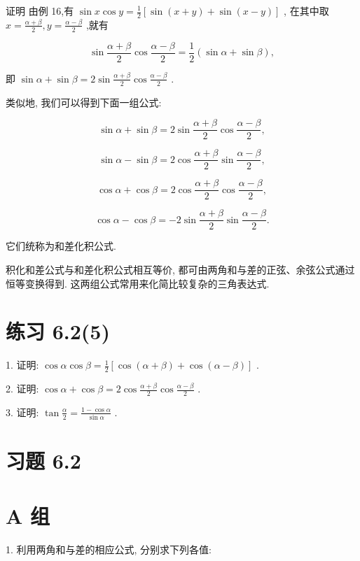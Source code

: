 \documentclass[10pt]{article}
\begin{document}
证明 由例 16,有 \(\sin x\cos y = \frac{1}{2}\left\lbrack  {\sin \left( {x + y}\right)  + \sin \left( {x - y}\right) }\right\rbrack\) , 在其中取 \(x = \frac{\alpha  + \beta }{2},y = \frac{\alpha  - \beta }{2}\) ,就有

\[
\sin \frac{\alpha  + \beta }{2}\cos \frac{\alpha  - \beta }{2} = \frac{1}{2}\left( {\sin \alpha  + \sin \beta }\right) ,
\]

即 \(\sin \alpha  + \sin \beta  = 2\sin \frac{\alpha  + \beta }{2}\cos \frac{\alpha  - \beta }{2}\) .

类似地, 我们可以得到下面一组公式:

\[
\sin \alpha  + \sin \beta  = 2\sin \frac{\alpha  + \beta }{2}\cos \frac{\alpha  - \beta }{2},
\]

\[
\sin \alpha  - \sin \beta  = 2\cos \frac{\alpha  + \beta }{2}\sin \frac{\alpha  - \beta }{2},
\]

\[
\cos \alpha  + \cos \beta  = 2\cos \frac{\alpha  + \beta }{2}\cos \frac{\alpha  - \beta }{2},
\]

\[
\cos \alpha  - \cos \beta  =  - 2\sin \frac{\alpha  + \beta }{2}\sin \frac{\alpha  - \beta }{2}.
\]

它们统称为和差化积公式.

积化和差公式与和差化积公式相互等价, 都可由两角和与差的正弦、余弦公式通过恒等变换得到. 这两组公式常用来化简比较复杂的三角表达式.

\section*{练习 6.2(5)}

1. 证明: \(\cos \alpha \cos \beta  = \frac{1}{2}\left\lbrack  {\cos \left( {\alpha  + \beta }\right)  + \cos \left( {\alpha  - \beta }\right) }\right\rbrack\) .

2. 证明: \(\cos \alpha  + \cos \beta  = 2\cos \frac{\alpha  + \beta }{2}\cos \frac{\alpha  - \beta }{2}\) .

3. 证明: \(\tan \frac{\alpha }{2} = \frac{1 - \cos \alpha }{\sin \alpha }\) .

\section*{习题 6.2}

\section*{A 组}

1. 利用两角和与差的相应公式, 分别求下列各值:
\end{document}
